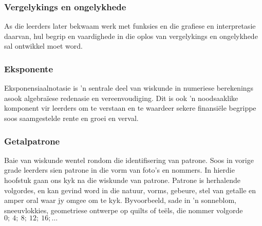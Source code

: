 \subsubsection{Vergelykings en ongelykhede}
As die leerders later bekwaam werk met funksies en die grafiese en interpretasie daarvan, hul begrip en vaardighede in die oplos van vergelykings en ongelykhede sal ontwikkel moet word.

\subsubsection{Eksponente}
Eksponensiaalnotasie is 'n sentrale deel van wiskunde in numeriese berekenings asook algebra\"{i}ese redenasie en vereenvoudiging. Dit is ook 'n noodsaaklike komponent vir leerders om te verstaan ​​en te waardeer sekere finansi\"{e}le begrippe soos saamgestelde rente en groei en verval.

\subsubsection{Getalpatrone}
Baie van wiskunde wentel rondom die identifisering van patrone. Soos in vorige grade leerders sien patrone in die vorm van foto's en nommers. In hierdie hoofstuk gaan ons kyk na die wiskunde van patrone. Patrone is herhalende volgordes, en kan gevind word in die natuur, vorms, gebeure, stel van getalle en amper oral waar jy omgee om te kyk. Byvoorbeeld, sade in 'n sonneblom, sneeuvlokkies, geometriese ontwerpe op quilts of te\"{e}ls, die nommer volgorde $0; ~4;~ 8;~ 12; ~16; \ldots$

